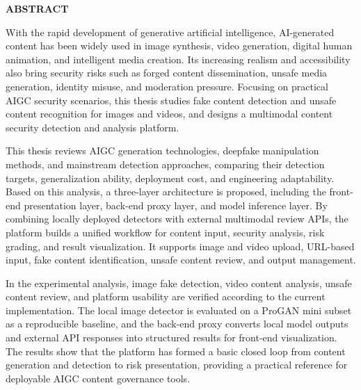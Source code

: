\begin{center}
  {\thesiswesternfont\fontsize{18pt}{27pt}\selectfont\bfseries ABSTRACT}
\end{center}

\vspace{1.5\baselineskip}

With the rapid development of generative artificial intelligence, AI-generated content has been widely used in image synthesis, video generation, digital human animation, and intelligent media creation. Its increasing realism and accessibility also bring security risks such as forged content dissemination, unsafe media generation, identity misuse, and moderation pressure. Focusing on practical AIGC security scenarios, this thesis studies fake content detection and unsafe content recognition for images and videos, and designs a multimodal content security detection and analysis platform.

This thesis reviews AIGC generation technologies, deepfake manipulation methods, and mainstream detection approaches, comparing their detection targets, generalization ability, deployment cost, and engineering adaptability. Based on this analysis, a three-layer architecture is proposed, including the front-end presentation layer, back-end proxy layer, and model inference layer. By combining locally deployed detectors with external multimodal review APIs, the platform builds a unified workflow for content input, security analysis, risk grading, and result visualization. It supports image and video upload, URL-based input, fake content identification, unsafe content review, and output management.

In the experimental analysis, image fake detection, video content analysis, unsafe content review, and platform usability are verified according to the current implementation. The local image detector is evaluated on a ProGAN mini subset as a reproducible baseline, and the back-end proxy converts local model outputs and external API responses into structured results for front-end visualization. The results show that the platform has formed a basic closed loop from content generation and detection to risk presentation, providing a practical reference for deployable AIGC content governance tools.

\vspace{1em}
